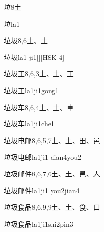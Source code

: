 \begin{Entry}{垃}{8}{⼟}
  \begin{Phonetics}{垃}{la1}
  \end{Phonetics}
\end{Entry}

\begin{Entry}{垃圾}{8,6}{⼟、⼟}
  \begin{Phonetics}{垃圾}{la1 ji1}[][HSK 4]
  \end{Phonetics}
\end{Entry}

\begin{Entry}{垃圾工}{8,6,3}{⼟、⼟、⼯}
  \begin{Phonetics}{垃圾工}{la1ji1gong1}
  \end{Phonetics}
\end{Entry}

\begin{Entry}{垃圾车}{8,6,4}{⼟、⼟、⾞}
  \begin{Phonetics}{垃圾车}{la1ji1che1}
  \end{Phonetics}
\end{Entry}

\begin{Entry}{垃圾电邮}{8,6,5,7}{⼟、⼟、⽥、⾢}
  \begin{Phonetics}{垃圾电邮}{la1ji1 dian4you2}
  \end{Phonetics}
\end{Entry}

\begin{Entry}{垃圾邮件}{8,6,7,6}{⼟、⼟、⾢、⼈}
  \begin{Phonetics}{垃圾邮件}{la1ji1 you2jian4}
  \end{Phonetics}
\end{Entry}

\begin{Entry}{垃圾食品}{8,6,9,9}{⼟、⼟、⾷、⼝}
  \begin{Phonetics}{垃圾食品}{la1ji1shi2pin3}
  \end{Phonetics}
\end{Entry}

